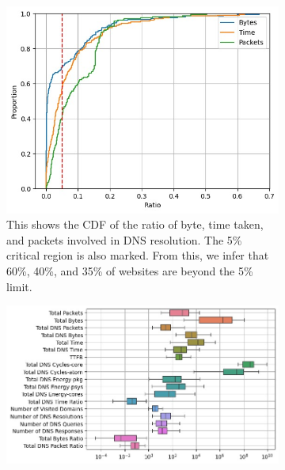 \documentclass{article}
\begin{document}

\begin{figure}[htpb]
    \centering
    \begin{subfigure}[b]{0.48\linewidth}
        \includegraphics[width=\linewidth]{plots/ratio-bytes-time.jpeg}
        \vspace{-7mm}
        \caption{This shows the CDF of the ratio of byte, time taken, and packets involved in DNS resolution. The 5\% critical region is also marked. From this, we infer that 60\%, 40\%, and 35\% of websites are beyond the 5\% limit.}
        \vspace{-3mm}
        \label{fig:ratio-bytes-time}
    \end{subfigure}
    \hfill
    \begin{subfigure}[b]{0.48\linewidth}
        \includegraphics[width=\linewidth]{plots/overall-candle.jpeg}

\end{subfigure}
\end{figure}
\end{document}
